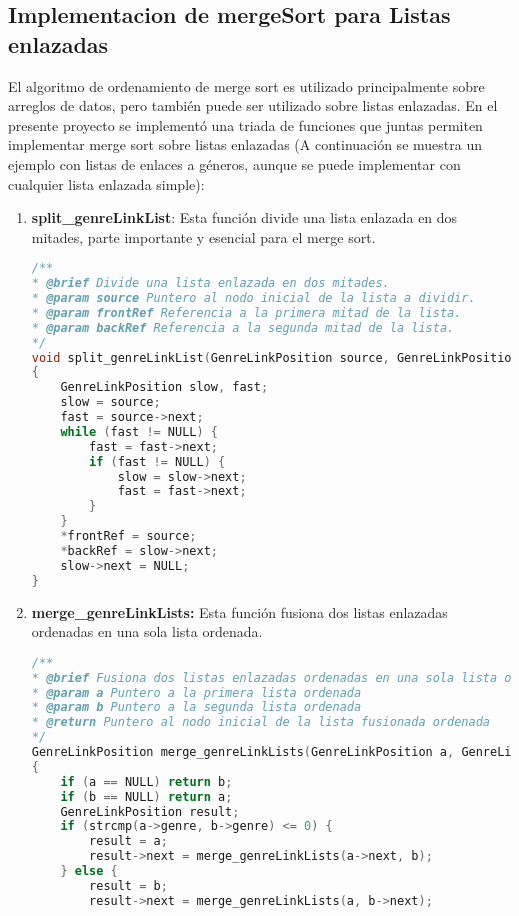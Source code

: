 \subsection{Implementacion de mergeSort para Listas enlazadas}
El algoritmo de ordenamiento de merge sort es utilizado principalmente sobre arreglos de datos, pero también puede ser utilizado sobre listas enlazadas. En el presente proyecto se implementó una triada de funciones que juntas permiten implementar merge sort sobre listas enlazadas (A continuación se muestra un ejemplo con listas de enlaces a géneros, aunque se puede implementar con cualquier lista enlazada simple):
\begin{enumerate}
    \item \textbf{split\_genreLinkList}: Esta función divide una lista enlazada en dos mitades, parte importante y esencial para el merge sort.
    \begin{lstlisting}[language=C, caption={split\_genreLinkList}, label={lst:codigo}]
/**
* @brief Divide una lista enlazada en dos mitades.
* @param source Puntero al nodo inicial de la lista a dividir.
* @param frontRef Referencia a la primera mitad de la lista.
* @param backRef Referencia a la segunda mitad de la lista.
*/
void split_genreLinkList(GenreLinkPosition source, GenreLinkPosition* frontRef, GenreLinkPosition* backRef)
{
    GenreLinkPosition slow, fast;
    slow = source;
    fast = source->next;
    while (fast != NULL) {
        fast = fast->next;
        if (fast != NULL) {
            slow = slow->next;
            fast = fast->next;
        }
    }
    *frontRef = source;
    *backRef = slow->next;
    slow->next = NULL;
}
\end{lstlisting}
    \item \textbf{merge\_genreLinkLists:} Esta función fusiona dos listas enlazadas ordenadas en una sola lista ordenada.
\begin{lstlisting}[language=C, caption={fusion de listas}, label={lst:codigo}]
/**
* @brief Fusiona dos listas enlazadas ordenadas en una sola lista ordenada
* @param a Puntero a la primera lista ordenada
* @param b Puntero a la segunda lista ordenada
* @return Puntero al nodo inicial de la lista fusionada ordenada
*/
GenreLinkPosition merge_genreLinkLists(GenreLinkPosition a, GenreLinkPosition b)
{
    if (a == NULL) return b;
    if (b == NULL) return a;
    GenreLinkPosition result;
    if (strcmp(a->genre, b->genre) <= 0) {
        result = a;
        result->next = merge_genreLinkLists(a->next, b);
    } else {
        result = b;
        result->next = merge_genreLinkLists(a, b->next);

\end{lstlisting}
\end{enumerate}
